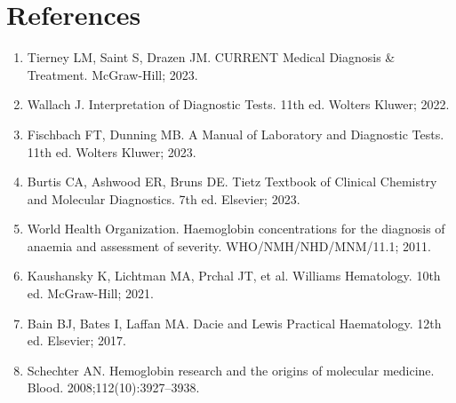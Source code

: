 \section*{References}
\begin{enumerate}
  \item Tierney LM, Saint S, Drazen JM. CURRENT Medical Diagnosis \& Treatment. McGraw-Hill; 2023.
  \item Wallach J. Interpretation of Diagnostic Tests. 11th ed. Wolters Kluwer; 2022.
  \item Fischbach FT, Dunning MB. A Manual of Laboratory and Diagnostic Tests. 11th ed. Wolters Kluwer; 2023.
  \item Burtis CA, Ashwood ER, Bruns DE. Tietz Textbook of Clinical Chemistry and Molecular Diagnostics. 7th ed. Elsevier; 2023.
  \item World Health Organization. Haemoglobin concentrations for the diagnosis of anaemia and assessment of severity. WHO/NMH/NHD/MNM/11.1; 2011.
  \item Kaushansky K, Lichtman MA, Prchal JT, et al. Williams Hematology. 10th ed. McGraw-Hill; 2021.
  \item Bain BJ, Bates I, Laffan MA. Dacie and Lewis Practical Haematology. 12th ed. Elsevier; 2017.
  \item Schechter AN. Hemoglobin research and the origins of molecular medicine. Blood. 2008;112(10):3927--3938.
\end{enumerate}

\clearpage
